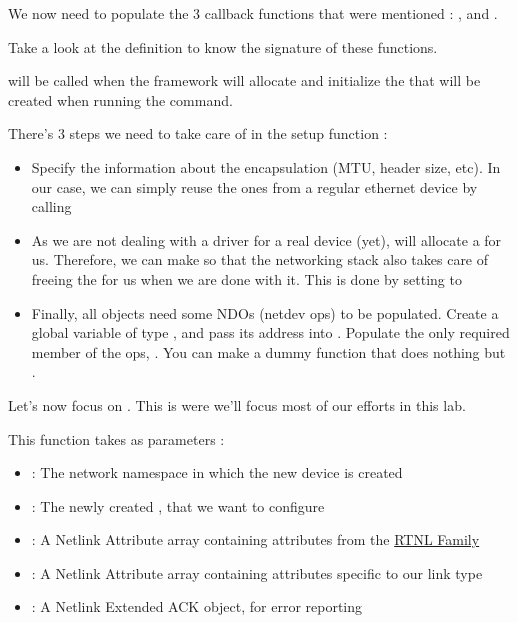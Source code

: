  We now need to populate the 3 callback functions that were mentioned : ,  and .
 
 Take a look at the  definition to know the signature of these functions.
 
  will be called when the  framework will allocate and initialize
 the  that will be created when running the  command.
 
 There's 3 steps we need to take care of in the setup function :
 \begin{itemize}
 	\item Specify the  information about the encapsulation (MTU, header size, etc). In our case, we can simply reuse the ones from a regular ethernet device by calling 
 	\item As we are not dealing with a driver for a real device (yet),  will allocate a  for us. Therefore, we can make so that the networking stack also takes care of freeing the  for us when we are done with it. This is done by setting  to 
	\item Finally, all  objects need some NDOs (netdev ops) to be populated. Create a global variable of type , and pass its address into . Populate the only required member of the ops, . You can make a dummy function that does nothing but .
 \end{itemize}

 Let's now focus on . This is were we'll focus most of our efforts in this lab.

 This function takes as parameters :
 \begin{itemize}
	 \item {} : The network namespace in which the new device is created
	 \item {} : The newly created , that we want to configure
	 \item {} : A Netlink Attribute array containing attributes from the \href{https://elixir.bootlin.com/linux/v6.12.32/A/ident/IFLA_LINK}{RTNL Family}
	 \item {} : A Netlink Attribute array containing attributes specific to our link type
	 \item {} : A Netlink Extended ACK object, for error reporting
 \end{itemize}

